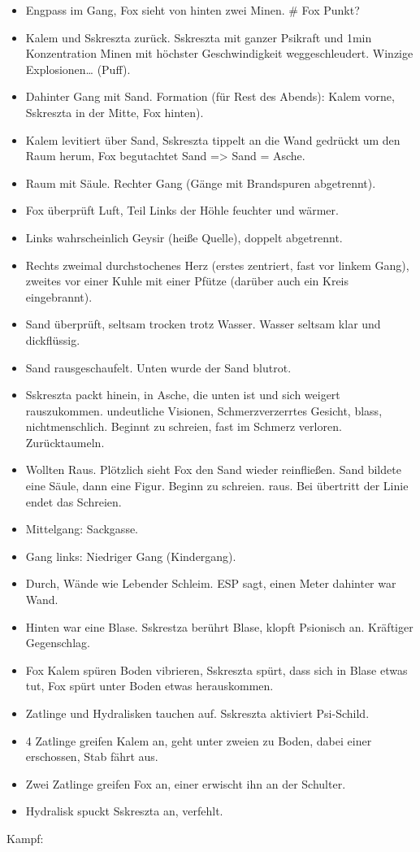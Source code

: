 \documentclass[11pt]{article}
\begin{document}
\begin{itemize}
\item
  Engpass im Gang, Fox sieht von hinten zwei Minen. \# Fox Punkt?
\item
  Kalem und Sskreszta zurück. Sskreszta mit ganzer Psikraft und 1min
  Konzentration Minen mit höchster Geschwindigkeit weggeschleudert.
  Winzige Explosionen\ldots{} (Puff).
\item
  Dahinter Gang mit Sand. Formation (für Rest des Abends): Kalem vorne,
  Sskreszta in der Mitte, Fox hinten).
\item
  Kalem levitiert über Sand, Sskreszta tippelt an die Wand gedrückt um
  den Raum herum, Fox begutachtet Sand =\textgreater{} Sand = Asche.
\item
  Raum mit Säule. Rechter Gang (Gänge mit Brandspuren abgetrennt).
\item
  Fox überprüft Luft, Teil Links der Höhle feuchter und wärmer.
\item
  Links wahrscheinlich Geysir (heiße Quelle), doppelt abgetrennt.
\item
  Rechts zweimal durchstochenes Herz (erstes zentriert, fast vor linkem
  Gang), zweites vor einer Kuhle mit einer Pfütze (darüber auch ein
  Kreis eingebrannt).
\item
  Sand überprüft, seltsam trocken trotz Wasser. Wasser seltsam klar und
  dickflüssig.
\item
  Sand rausgeschaufelt. Unten wurde der Sand blutrot.
\item
  Sskreszta packt hinein, in Asche, die unten ist und sich weigert
  rauszukommen. undeutliche Visionen, Schmerzverzerrtes Gesicht, blass,
  nichtmenschlich. Beginnt zu schreien, fast im Schmerz verloren.
  Zurücktaumeln.
\item
  Wollten Raus. Plötzlich sieht Fox den Sand wieder reinfließen. Sand
  bildete eine Säule, dann eine Figur. Beginn zu schreien. raus. Bei
  übertritt der Linie endet das Schreien.
\item
  Mittelgang: Sackgasse.
\item
  Gang links: Niedriger Gang (Kindergang).
\item
  Durch, Wände wie Lebender Schleim. ESP sagt, einen Meter dahinter war
  Wand.
\item
  Hinten war eine Blase. Sskrestza berührt Blase, klopft Psionisch an.
  Kräftiger Gegenschlag.
\item
  Fox Kalem spüren Boden vibrieren, Sskreszta spürt, dass sich in Blase
  etwas tut, Fox spürt unter Boden etwas herauskommen.
\item
  Zatlinge und Hydralisken tauchen auf. Sskreszta aktiviert Psi-Schild.
\item
  4 Zatlinge greifen Kalem an, geht unter zweien zu Boden, dabei einer
  erschossen, Stab fährt aus.
\item
  Zwei Zatlinge greifen Fox an, einer erwischt ihn an der Schulter.
\item
  Hydralisk spuckt Sskreszta an, verfehlt.
\end{itemize}
Kampf:
\end{document}
